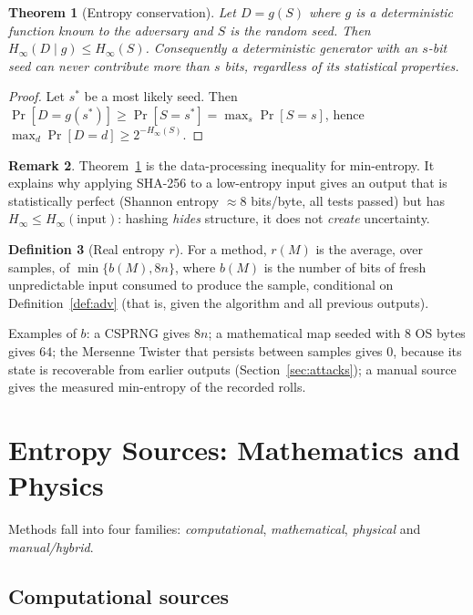 \documentclass[11pt,a4paper]{article}
\theoremstyle{plain}
\newtheorem{theorem}{Theorem}[section]
\theoremstyle{definition}
\newtheorem{definition}[theorem]{Definition}
\newtheorem{remark}[theorem]{Remark}
\newcommand{\Hmin}{H_\infty}
\begin{document}
\begin{theorem}[Entropy conservation]\label{thm:conservation}
Let $D=g(S)$ where $g$ is a deterministic function known to the adversary and
$S$ is the random seed. Then $\Hmin(D\mid g)\le\Hmin(S)$. Consequently a
deterministic generator with an $s$-bit seed can never contribute more than
$s$ bits, regardless of its statistical properties.
\end{theorem}

\begin{proof}
Let $s^\ast$ be a most likely seed. Then
$\Pr[D=g(s^\ast)]\ge\Pr[S=s^\ast]=\max_s\Pr[S=s]$, hence
$\max_d\Pr[D=d]\ge 2^{-\Hmin(S)}$.
\end{proof}

\begin{remark}
Theorem~\ref{thm:conservation} is the data-processing inequality for
min-entropy. It explains why applying SHA-256 to a low-entropy input gives an
output that is statistically perfect (Shannon entropy $\approx 8$ bits/byte,
all tests passed) but has $\Hmin\le\Hmin(\text{input})$: hashing \emph{hides}
structure, it does not \emph{create} uncertainty.
\end{remark}

\begin{definition}[Real entropy $r$]
For a method, $r(M)$ is the average, over samples, of $\min\{b(M),8n\}$, where
$b(M)$ is the number of bits of fresh unpredictable input consumed to produce
the sample, conditional on Definition~\ref{def:adv} (that is, given the
algorithm and all previous outputs).
\end{definition}

Examples of $b$: a CSPRNG gives $8n$; a mathematical map seeded with 8 OS bytes
gives $64$; the Mersenne Twister that persists between samples gives $0$,
because its state is recoverable from earlier outputs (Section~\ref{sec:attacks});
a manual source gives the measured min-entropy of the recorded rolls.

\section{Entropy Sources: Mathematics and Physics}

Methods fall into four families: \emph{computational}, \emph{mathematical},
\emph{physical} and \emph{manual/hybrid}.

\subsection{Computational sources}
\end{document}
